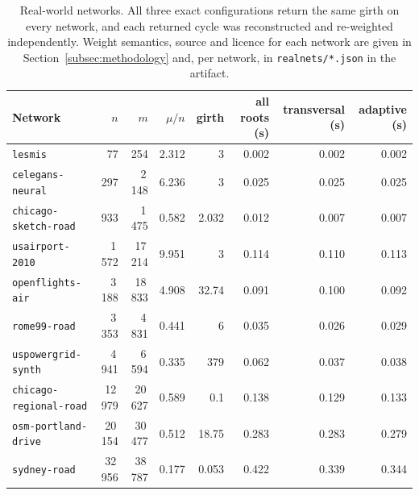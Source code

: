 \begin{table}[ht]
\centering
\footnotesize
\setlength{\tabcolsep}{4pt}
\begin{tabular}{|l|r|r|r|r|r|r|r|}
\hline
\textbf{Network} & $n$ & $m$ & $\mu/n$ & \textbf{girth} & \textbf{all roots (s)} & \textbf{transversal (s)} & \textbf{adaptive (s)} \\ \hline
\texttt{lesmis} & 77 & 254 & 2.312 & 3 & 0.002 & 0.002 & 0.002 \\ \hline
\texttt{celegans-neural} & 297 & 2\,148 & 6.236 & 3 & 0.025 & 0.025 & 0.025 \\ \hline
\texttt{chicago-sketch-road} & 933 & 1\,475 & 0.582 & 2.032 & 0.012 & 0.007 & 0.007 \\ \hline
\texttt{usairport-2010} & 1\,572 & 17\,214 & 9.951 & 3 & 0.114 & 0.110 & 0.113 \\ \hline
\texttt{openflights-air} & 3\,188 & 18\,833 & 4.908 & 32.74 & 0.091 & 0.100 & 0.092 \\ \hline
\texttt{rome99-road} & 3\,353 & 4\,831 & 0.441 & 6 & 0.035 & 0.026 & 0.029 \\ \hline
\texttt{uspowergrid-synth} & 4\,941 & 6\,594 & 0.335 & 379 & 0.062 & 0.037 & 0.038 \\ \hline
\texttt{chicago-regional-road} & 12\,979 & 20\,627 & 0.589 & 0.1 & 0.138 & 0.129 & 0.133 \\ \hline
\texttt{osm-portland-drive} & 20\,154 & 30\,477 & 0.512 & 18.75 & 0.283 & 0.283 & 0.279 \\ \hline
\texttt{sydney-road} & 32\,956 & 38\,787 & 0.177 & 0.053 & 0.422 & 0.339 & 0.344 \\ \hline
\end{tabular}
\caption{Real-world networks. All three exact configurations return the same
girth on every network, and each returned cycle was reconstructed and
re-weighted independently. Weight semantics, source and licence for each
network are given in Section~\ref{subsec:methodology} and, per network, in
\texttt{realnets/*.json} in the artifact.}
\label{tab:real}
\end{table}
